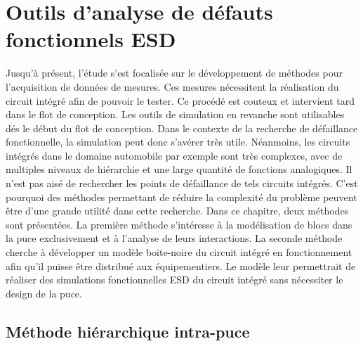 \chapter{Outils d'analyse de défauts fonctionnels ESD}
\label{chap:4}

Jusqu'à présent, l'étude s'est focalisée sur le développement de méthodes pour l'acquisition de données de mesures.
Ces mesures nécessitent la réalisation du circuit intégré afin de pouvoir le tester.
Ce procédé est couteux et intervient tard dans le flot de conception.
Les outils de simulation en revanche sont utilisables dés le début du flot de conception.
Dans le contexte de la recherche de défaillance fonctionnelle, la simulation peut donc s'avérer très utile.
Néanmoins, les circuits intégrés dans le domaine automobile par exemple sont très complexes, avec de multiples niveaux de hiérarchie et une large quantité de fonctions analogiques.
Il n'est pas aisé de rechercher les points de défaillance de tels circuits intégrés.
C'est pourquoi des méthodes permettant de réduire la complexité du problème peuvent être d'une grande utilité dans cette recherche.
Dans ce chapitre, deux méthodes sont présentées.
La première méthode s'intéresse à la modélisation de blocs dans la puce exclusivement et à l'analyse de leurs interactions.
La seconde méthode cherche à développer un modèle boite-noire du circuit intégré en fonctionnement afin qu'il puisse être distribué aux équipementiers.
Le modèle leur permettrait de réaliser des simulations fonctionnelles ESD du circuit intégré sans nécessiter le design de la puce.

\section{Méthode hiérarchique intra-puce}

